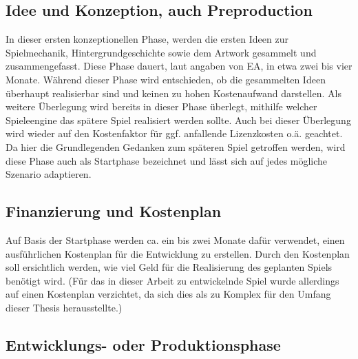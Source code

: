 \subsection{Idee und Konzeption, auch Preproduction}
In dieser ersten konzeptionellen Phase, werden die ersten Ideen zur Spielmechanik, Hintergrundgeschichte sowie dem Artwork gesammelt und zusammengefasst. Diese Phase dauert, laut angaben von EA, in etwa zwei bis vier Monate. Während dieser Phase wird entschieden, ob die gesammelten Ideen überhaupt realisierbar sind und keinen zu hohen Kostenaufwand darstellen. Als weitere Überlegung wird bereits in dieser Phase überlegt, mithilfe welcher Spieleengine das spätere Spiel realisiert werden sollte. Auch bei dieser Überlegung wird wieder auf den Kostenfaktor für ggf. anfallende Lizenzkosten o.ä. geachtet. Da hier die Grundlegenden Gedanken zum späteren Spiel getroffen werden, wird diese Phase auch als Startphase bezeichnet und lässt sich auf jedes mögliche Szenario adaptieren.

\subsection{Finanzierung und Kostenplan}
Auf Basis der Startphase werden ca. ein bis zwei Monate dafür verwendet, einen ausführlichen Kostenplan für die Entwicklung zu erstellen. Durch den Kostenplan soll ersichtlich werden, wie viel Geld für die Realisierung des geplanten Spiels benötigt wird. 
(Für das in dieser Arbeit zu entwickelnde Spiel wurde allerdings auf einen Kostenplan verzichtet, da sich dies als zu Komplex für den Umfang dieser Thesis herausstellte.)


\subsection{Entwicklungs- oder Produktionsphase}

